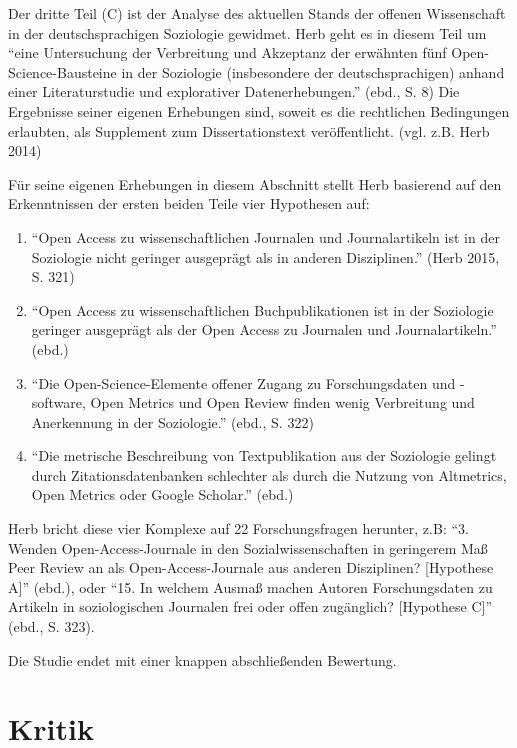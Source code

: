 \documentclass[a4paper,
fontsize=11pt,
oneside,
numbers=noperiodatend,
parskip=half-,
bibliography=totoc,
final
]{scrartcl}
\begin{document}
Der dritte Teil (C) ist der Analyse des aktuellen Stands der offenen
Wissenschaft in der deutschsprachigen Soziologie gewidmet. Herb geht es
in diesem Teil um \enquote{eine Untersuchung der Verbreitung und
Akzeptanz der erwähnten fünf Open-Science-Bausteine in der Soziologie
(insbesondere der deutschsprachigen) anhand einer Literaturstudie und
explorativer Datenerhebungen.} (ebd., S. 8) Die Ergebnisse seiner
eigenen Erhebungen sind, soweit es die rechtlichen Bedingungen
erlaubten, als Supplement zum Dissertationstext veröffentlicht. (vgl.
z.B. Herb 2014)

Für seine eigenen Erhebungen in diesem Abschnitt stellt Herb basierend
auf den Erkenntnissen der ersten beiden Teile vier Hypothesen auf:

\begin{enumerate}
\def\labelenumi{\Alph{enumi}.}
\item
  \enquote{Open Access zu wissenschaftlichen Journalen und
  Journalartikeln ist in der Soziologie nicht geringer ausgeprägt als in
  anderen Disziplinen.} (Herb 2015, S. 321)
\item
  \enquote{Open Access zu wissenschaftlichen Buchpublikationen ist in
  der Soziologie geringer ausgeprägt als der Open Access zu Journalen
  und Journalartikeln.} (ebd.)
\item
  \enquote{Die Open-Science-Elemente offener Zugang zu Forschungsdaten
  und -software, Open Metrics und Open Review finden wenig Verbreitung
  und Anerkennung in der Soziologie.} (ebd., S. 322)
\item
  \enquote{Die metrische Beschreibung von Textpublikation aus der
  Soziologie gelingt durch Zitationsdatenbanken schlechter als durch die
  Nutzung von Altmetrics, Open Metrics oder Google Scholar.} (ebd.)
\end{enumerate}

Herb bricht diese vier Komplexe auf 22 Forschungsfragen herunter, z.B:
\enquote{3. Wenden Open-Access-Journale in den Sozialwissenschaften in
geringerem Maß Peer Review an als Open-Access-Journale aus anderen
Disziplinen? {[}Hypothese A{]}} (ebd.), oder \enquote{15. In welchem
Ausmaß machen Autoren Forschungsdaten zu Artikeln in soziologischen
Journalen frei oder offen zugänglich? {[}Hypothese C{]}} (ebd., S. 323).

Die Studie endet mit einer knappen abschließenden Bewertung.

\section*{Kritik}\label{kritik}
\end{document}
